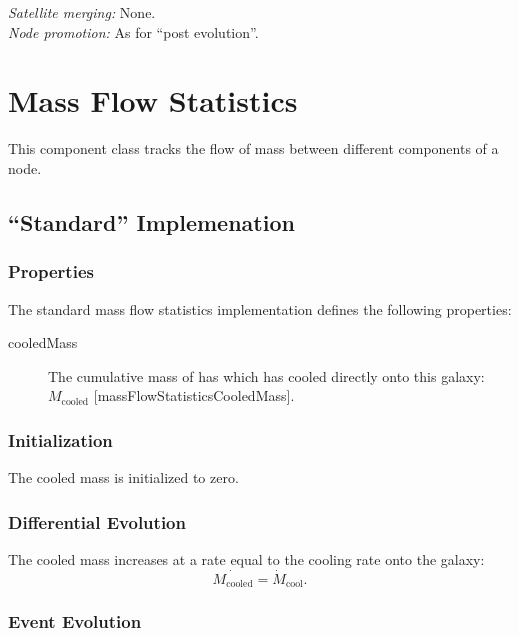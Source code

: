 \noindent\emph{Satellite merging:} None.\\

\noindent\emph{Node promotion:} As for ``post evolution''.\\

\section{Mass Flow Statistics}

This component class tracks the flow of mass between different components of a \gls{node}.

\subsection{``Standard'' Implemenation}

\subsubsection{Properties}

The standard mass flow statistics implementation defines the following properties:
\begin{description}
 \item [{\normalfont \ttfamily cooledMass}] The cumulative mass of has which has cooled directly onto this galaxy: $M_\mathrm{cooled}$ [{\normalfont \ttfamily massFlowStatisticsCooledMass}].
\end{description}

\subsubsection{Initialization}

The cooled mass is initialized to zero.

\subsubsection{Differential Evolution}

The cooled mass increases at a rate equal to the cooling rate onto the galaxy:
\begin{equation}
  \dot{M_\mathrm{cooled}} = \dot{M}_\mathrm{cool}.
\end{equation}

\subsubsection{Event Evolution}

